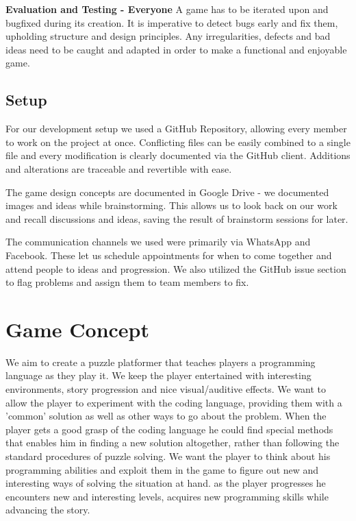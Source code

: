 \documentclass[a4paper,twoside,12pt]{article}
\begin{document}
\textbf{Evaluation and Testing - Everyone}
A game has to be iterated upon and bugfixed during its creation. It is imperative to detect bugs early and fix them, upholding structure and design principles. Any irregularities, defects and bad ideas need to be caught and adapted in order to make a functional and enjoyable game.\\

\subsection{Setup}

For our development setup we used a GitHub Repository, allowing every member to work on the project at once. Conflicting files can be easily combined to a single file and every modification is clearly documented via the GitHub client. Additions and alterations are traceable and revertible with ease.

The game design concepts are documented in Google Drive - we documented images and ideas while brainstorming. This allows us to look back on our work and recall discussions and ideas, saving the result of brainstorm sessions for later.


The communication channels we used were primarily via WhatsApp and Facebook. These let us schedule appointments for when to come together and attend people to ideas and progression. We also utilized the GitHub issue section to flag problems and assign them to team members to fix.

\section{Game Concept}
We aim to create a puzzle platformer that teaches players a programming language as they play it. We keep the player entertained with interesting environments, story progression and nice visual/auditive effects. We want to allow the player to experiment with the coding language, providing them with a 'common' solution as well as other ways to go about the problem. When the player gets a good grasp of the coding language he could find special methods that enables him in finding a new solution altogether, rather than following the standard procedures of puzzle solving. We want the player to think about his programming abilities and exploit them in the game to figure out new and interesting ways of solving the situation at hand.
as the player progresses he encounters new and interesting levels, acquires new programming skills while advancing the story.
\end{document}
